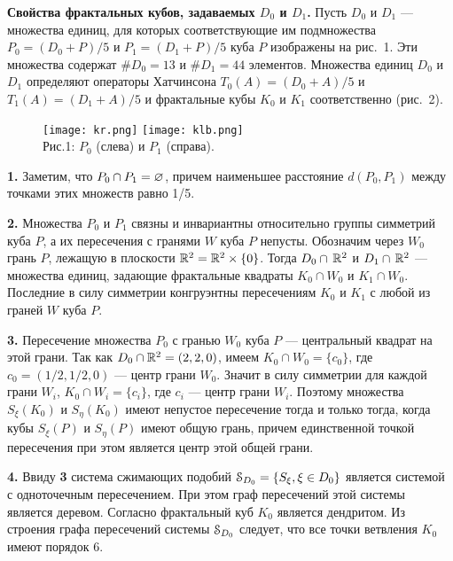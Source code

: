 {\bf Свойства фрактальных кубов, задаваемых $ D_0$ и  $ D_1$.}
Пусть $ D_0$ и $ D_1$ --- множества единиц, для которых соответствующие им подмножества $P_0=( D_0+P)/5$  и $P_1=( D_1+P)/5$ куба $P$ изображены на рис.~1. Эти множества содержат $\# D_0=13$ и $\# D_1= 44$ элементов.
 Множества единиц $ D_0$ и $ D_1$ определяют операторы Хатчинсона $ T_0(A)=( D_0+A)/{5}$   и $T_1(A)=( D_1+A)/{5}$   и фрактальные кубы $K_0$ и $K_1$ соответственно (рис.~2).\smallskip

\begin{figure}[b!]
\centering
\qquad\qquad\texttt{[image: kr.png]}
\hfill
\texttt{[image: klb.png]}\qquad\qquad\\
[2ex]
{\footnotesize Рис.1: $P_0$ (слева)  и $P_1$ (справа).}
\end{figure}


{\bf 1.} Заметим, что $P_0\cap P_1=\varnothing$, причем наименьшее расстояние $d(P_0,P_1)$ между точками этих множеств  равно 1/5.\smallskip

{\bf 2.} Множества $P_0$ и $P_1$ связны  и  инвариантны относительно группы симметрий куба $P$,  а их пересечения с гранями $W$ куба $P$ непусты. Обозначим через $W_0$   грань  $P$, лежащую в плоскости $\mathbb{R}^2=\mathbb{R}^2\times\{0\}$. Тогда $ D_0\cap\, \mathbb{R}^2$ и $ D_1\cap\, \mathbb{R}^2$ --- множества единиц, задающие фрактальные квадраты $K_0\cap W_0$ и $K_1\cap W_0$. Последние в силу симметрии конгруэнтны пересечениям $K_0$ и $K_1$ с любой из граней $W$ куба $P$.\smallskip

{\bf 3.} Пересечение множества $P_0$  с гранью $W_0$ куба $P$ --- центральный квадрат  на этой грани. Так как $ D_0\cap \mathbb{R}^2=(2,2,0)$,  имеем $K_0\cap W_0=\{c_0\} $, где $c_0=(1/2,1/2,0)$ --- центр грани $W_0$. Значит в силу симметрии для каждой грани $W_i$,  $K_0\cap W_i=\{c_i\} $, где $c_i$ --- центр грани $W_i$. Поэтому множества $S_\xi(K_0)$ и $S_\eta(K_0)$ имеют непустое пересечение тогда и только тогда, когда кубы  $S_\xi(P)$ и $S_\eta(P)$ имеют общую грань, причем   единственной точкой пересечения при этом является центр этой общей грани.\smallskip

{\bf 4.} Ввиду {\bf 3} система сжимающих подобий ${\EuScript S}_{ D_0}=\{S_\xi,\xi\in  D_0\}$ является системой с одноточечным пересечением. При этом  граф пересечений этой системы является деревом. Согласно \cite[Theorem 1.7]{FIP} фрактальный куб $K_0$ является дендритом. Из строения графа пересечений системы ${\EuScript S}_{ D_0}$ следует, что  все точки ветвления $K_0$ имеют порядок 6.\smallskip

